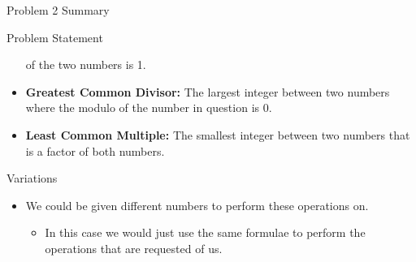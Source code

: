 \begin{summary}{Problem 2 Summary}
\begin{statement}{Problem Statement}
\begin{itemize}
            of the two numbers is 1.
            \item \textbf{Greatest Common Divisor:} The largest integer between two numbers where the modulo of the number in question is 0.
            \item \textbf{Least Common Multiple:} The smallest integer between two numbers that is a factor of both numbers.
        \end{itemize}
    \end{statement}
    \begin{statement}{Variations}
        \begin{itemize}
            \item We could be given different numbers to perform these operations on.
            \begin{itemize}
                \item In this case we would just use the same formulae to perform the operations that are requested of us.
            \end{itemize}
        \end{itemize}
    \end{statement}
\end{summary}

